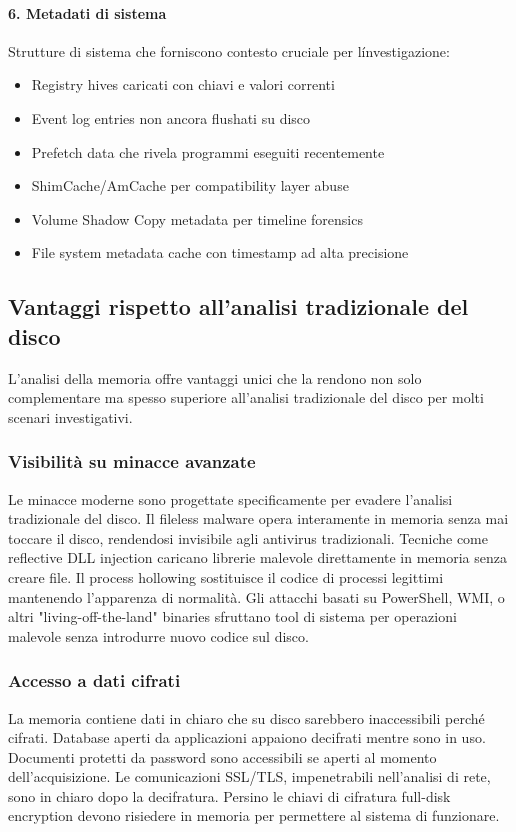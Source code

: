\paragraph{6. Metadati di sistema}
Strutture di sistema che forniscono contesto cruciale per l\'investigazione:
\begin{itemize}
    \item Registry hives caricati con chiavi e valori correnti
    \item Event log entries non ancora flushati su disco
    \item Prefetch data che rivela programmi eseguiti recentemente
    \item ShimCache/AmCache per compatibility layer abuse
    \item Volume Shadow Copy metadata per timeline forensics
    \item File system metadata cache con timestamp ad alta precisione
\end{itemize}

\subsection{Vantaggi rispetto all'analisi tradizionale del disco}

L'analisi della memoria offre vantaggi unici che la rendono non solo complementare ma spesso superiore all'analisi tradizionale del disco per molti scenari investigativi.

\subsubsection{Visibilità su minacce avanzate}
Le minacce moderne sono progettate specificamente per evadere l'analisi tradizionale del disco. Il fileless malware opera interamente in memoria senza mai toccare il disco, rendendosi invisibile agli antivirus tradizionali. Tecniche come reflective DLL injection caricano librerie malevole direttamente in memoria senza creare file. Il process hollowing sostituisce il codice di processi legittimi mantenendo l'apparenza di normalità. Gli attacchi basati su PowerShell, WMI, o altri "living-off-the-land" binaries sfruttano tool di sistema per operazioni malevole senza introdurre nuovo codice sul disco.

\subsubsection{Accesso a dati cifrati}
La memoria contiene dati in chiaro che su disco sarebbero inaccessibili perché cifrati. Database aperti da applicazioni appaiono decifrati mentre sono in uso. Documenti protetti da password sono accessibili se aperti al momento dell'acquisizione. Le comunicazioni SSL/TLS, impenetrabili nell'analisi di rete, sono in chiaro dopo la decifratura. Persino le chiavi di cifratura full-disk encryption devono risiedere in memoria per permettere al sistema di funzionare.

